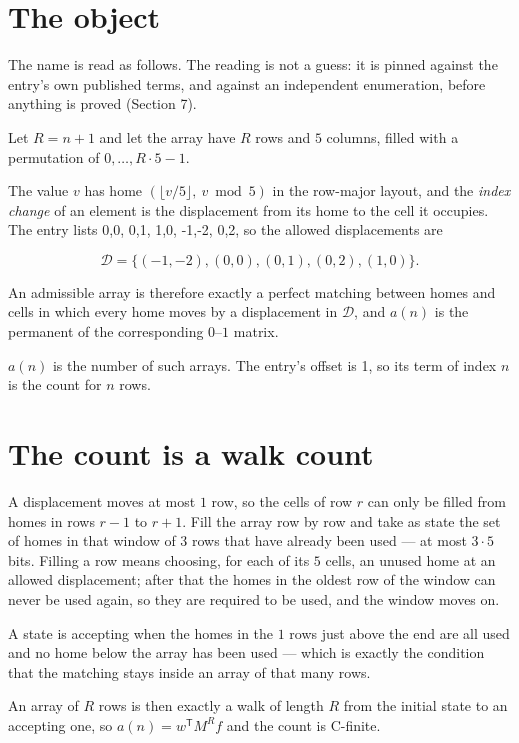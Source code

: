 \documentclass[11pt]{article}
\theoremstyle{definition}
\begin{document}
\section{The object}

The name is read as follows. The reading is not a guess: it is pinned against the entry's own published terms, and against an independent enumeration, before anything is proved (Section 7).

Let $R = n + 1$ and let the array have $R$ rows and $5$ columns, filled with a permutation of $0,\dots,R\cdot5-1$.

The value $v$ has home $(\lfloor v/5\rfloor,\ v \bmod 5)$ in the row-major layout, and the {\itshape index change} of an element is the displacement from its home to the cell it occupies. The entry lists 0,0, 0,1, 1,0, -1,-2, 0,2, so the allowed displacements are

\[\mathcal{D} = \{(-1,-2), (0,0), (0,1), (0,2), (1,0)\}.\]

An admissible array is therefore exactly a perfect matching between homes and cells in which every home moves by a displacement in $\mathcal{D}$, and $a(n)$ is the permanent of the corresponding $0$--$1$ matrix.

$a(n)$ is the number of such arrays. The entry's offset is 1, so its term of index $n$ is the count for $n$ rows.

\section{The count is a walk count}

A displacement moves at most $1$ row, so the cells of row $r$ can only be filled from homes in rows $r-1$ to $r+1$. Fill the array row by row and take as state the set of homes in that window of $3$ rows that have already been used --- at most $3\cdot5$ bits. Filling a row means choosing, for each of its $5$ cells, an unused home at an allowed displacement; after that the homes in the oldest row of the window can never be used again, so they are required to be used, and the window moves on.

A state is accepting when the homes in the $1$ rows just above the end are all used and no home below the array has been used --- which is exactly the condition that the matching stays inside an array of that many rows.

An array of $R$ rows is then exactly a walk of length $R$ from the initial state to an accepting one, so $a(n) = w^{\mathsf T}M^{R}f$ and the count is C-finite.
\end{document}
